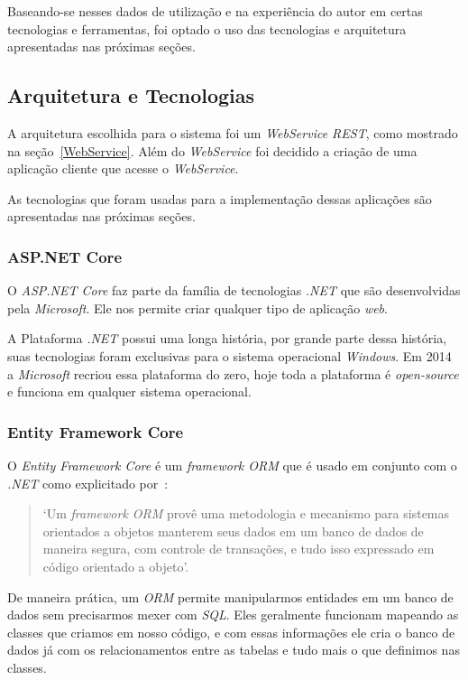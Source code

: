 \documentclass[12pt]{article}
\begin{document}
Baseando-se nesses dados de utilização e na experiência do autor em certas tecnologias e ferramentas,
foi optado o uso das tecnologias e arquitetura apresentadas nas próximas seções.

\subsection{Arquitetura e Tecnologias}

A arquitetura escolhida para o sistema foi um \textit{WebService REST}, como mostrado na seção~\ref{WebService}.
Além do \textit{WebService} foi decidido a criação de uma aplicação cliente que acesse o \textit{WebService}.

As tecnologias que foram usadas para a implementação dessas aplicações são apresentadas nas próximas seções.

\subsubsection{ASP.NET Core}

O \textit{ASP.NET Core} faz parte da família de tecnologias \textit{.NET} que são desenvolvidas pela \textit{Microsoft}.
Ele nos permite criar qualquer tipo de aplicação \textit{web}.

A Plataforma \textit{.NET} possui uma longa história, por grande parte dessa história, suas
tecnologias foram exclusivas para o sistema operacional \textit{Windows}. Em 2014 a \textit{Microsoft} recriou
essa plataforma do zero, hoje toda a plataforma é \textit{open-source} e funciona em qualquer
sistema operacional.

\subsubsection{Entity Framework Core}

O \textit{Entity Framework Core} é um \textit{framework ORM} que é usado em conjunto com o \textit{.NET}
como explicitado por~\cite{ormHibernate}:

\begin{quote}
  `Um \textit{framework ORM} provê uma metodologia e mecanismo
  para sistemas orientados a objetos manterem seus dados em um banco de dados de maneira
  segura, com controle de transações, e tudo isso expressado em código orientado a objeto'.
\end{quote}

De maneira prática, um \textit{ORM} permite manipularmos entidades em um banco de dados
sem precisarmos mexer com \textit{SQL}. Eles geralmente funcionam mapeando as classes
que criamos em nosso código, e com essas informações ele cria o banco de dados já com os relacionamentos
entre as tabelas e tudo mais o que definimos nas classes.
\end{document}
